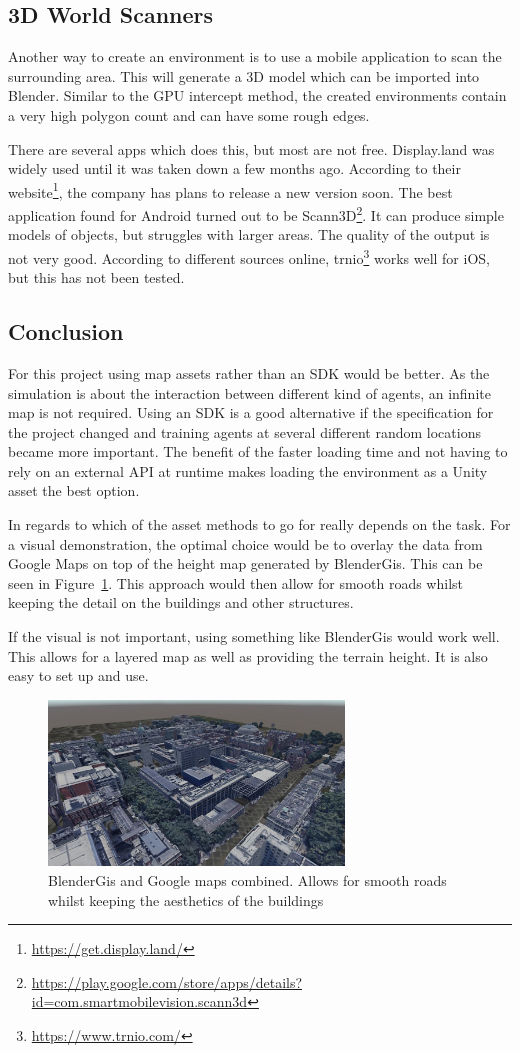 \subsection{3D World Scanners}
Another way to create an environment is to use a mobile application to scan the surrounding area. This will generate a 3D model which can be imported into Blender. Similar to the GPU intercept method, the created environments contain a very high polygon count and can have some rough edges.

There are several apps which does this, but most are not free. Display.land was widely used until it was taken down a few months ago. According to their website\footnote{\url{https://get.display.land/}}, the company has plans to release a new version soon. The best application found for Android turned out to be Scann3D\footnote{\url{https://play.google.com/store/apps/details?id=com.smartmobilevision.scann3d}}. It can produce simple models of objects, but struggles with larger areas. The quality of the output is not very good. According to different sources online, trnio\footnote{\url{https://www.trnio.com/}} works well for iOS, but this has not been tested. 


\subsection{Conclusion}
For this project using map assets rather than an SDK would be better. As the simulation is about the interaction between different kind of agents, an infinite map is not required. Using an SDK is a good alternative if the specification for the project changed and training agents at several different random locations became more important. The benefit of the faster loading time and not having to rely on an external API at runtime makes loading the environment as a Unity asset the best option. 

In regards to which of the asset methods to go for really depends on the task. For a visual demonstration, the optimal choice would be to overlay the data from Google Maps on top of the height map generated by BlenderGis. This can be seen in Figure~\ref{maps:figure:combined}. This approach would then allow for smooth roads whilst keeping the detail on the buildings and other structures. 

If the visual is not important, using something like BlenderGis would work well. This allows for a layered map as well as providing the terrain height. It is also easy to set up and use. 

\begin{figure}[H]
    \centering
    \includegraphics[width=0.7\textwidth]{06_Implementation/00_Maps/Images/CombinedCropped.JPG}
    \caption{BlenderGis and Google maps combined. Allows for smooth roads whilst keeping the aesthetics of the buildings}
    \label{maps:figure:combined}
\end{figure}
